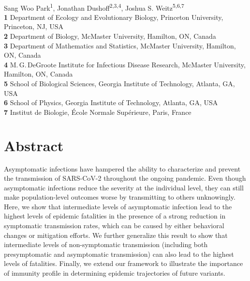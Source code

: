 \documentclass[12pt]{article}
\date{\today}
\begin{document}
\begin{flushleft}{
	\Large
	\textbf{}
}
\newline
\\
Sang Woo Park\textsuperscript{1},
Jonathan Dushoff\textsuperscript{2,3,4},
Joshua S. Weitz\textsuperscript{5,6,7}
\\
\bigskip
\textbf{1} Department of Ecology and Evolutionary Biology, Princeton University, Princeton, NJ, USA
\\
\textbf{2} Department of Biology, McMaster University, Hamilton, ON, Canada
\\
\textbf{3} Department of Mathematics and Statistics, McMaster University, Hamilton, ON, Canada
\\
\textbf{4} M.\,G.\,DeGroote Institute for Infectious Disease Research, McMaster University, Hamilton, ON, Canada
\\
\textbf{5} School of Biological Sciences, Georgia Institute of Technology, Atlanta, GA, USA
\\
\textbf{6} School of Physics, Georgia Institute of Technology, Atlanta, GA, USA
\\
\textbf{7} Institut de Biologie, \'{E}cole Normale Sup\'{e}rieure, Paris, France
\\
\bigskip

\bigskip
\end{flushleft}

\section*{Abstract}

Asymptomatic infections have hampered the ability to characterize and prevent the transmission of SARS-CoV-2 throughout the ongoing pandemic.
Even though asymptomatic infections reduce the severity at the individual level, they can still make population-level outcomes worse by transmitting to others unknowingly.
Here, we show that intermediate levels of asymptomatic infection lead to the highest levels of epidemic fatalities in the presence of a strong reduction in symptomatic transmission rates, which can be caused by either behavioral changes or mitigation efforts.
We further generalize this result to show that intermediate levels of non-symptomatic transmission (including both presymptomatic and asymptomatic transmission) can also lead to the highest levels of fatalities.
Finally, we extend our framework to illustrate the importance of immunity profile in determining epidemic trajectories of future variants. 
\end{document}

